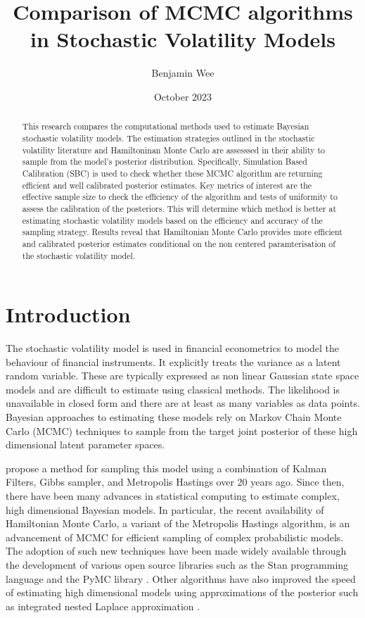 \documentclass[12pt, a4paper]{article}
\title{Comparison of MCMC algorithms in Stochastic Volatility Models}
\author{Benjamin Wee}
\date{October 2023}
\begin{document}
\maketitle 

\begin{abstract}
    This research compares the computational methods used to estimate Bayesian stochastic volatility models. The estimation strategies outlined in the stochastic volatility literature and Hamiltoninan Monte Carlo are assesssed in their ability to sample from the model's posterior distribution. Specifically, Simulation Based Calibration (SBC) is used to check whether these MCMC algorithm are returning efficient and well calibrated posterior estimates. Key metrics of interest are the effective sample size to check the efficiency of the algorithm and tests of uniformity to assess the calibration of the posteriors. This will determine which method is better at estimating stochastic volatility models based on the efficiency and accuracy of the sampling strategy. Results reveal that Hamiltonian Monte Carlo provides more efficient and calibrated posterior estimates conditional on the non centered paramterisation of the stochastic volatility model. 
\end{abstract}

\newpage

\tableofcontents{\protect\newpage}

\section{Introduction}
    The stochastic volatility model is used in financial econometrics to model the behaviour of financial instruments. It explicitly treats the variance as a latent random variable. These are typically expressed as non linear Gaussian state space models and are difficult to estimate using classical methods. The likelihood is unavailable in closed form and there are at least as many variables as data points. Bayesian approaches to estimating these models rely on  Markov Chain Monte Carlo (MCMC) techniques to sample from the target joint posterior of these high dimensional latent parameter spaces. 

    \citet{kim1998stochastic} propose a method for sampling this model using a combination of Kalman Filters, Gibbs sampler, and Metropolis Hastings over 20 years ago.  Since then, there have been many advances in statistical computing to estimate complex, high dimensional Bayesian models. In particular, the recent availability of Hamiltonian Monte Carlo, a variant of the Metropolis Hastings algorithm, is an advancement of MCMC for efficient sampling of complex probabilistic models. The adoption of such new techniques have been made widely available through the development of various open source libraries such as the Stan programming language \citep{stan} and the PyMC library \citep{pymc2023}. Other algorithms have also improved the speed of estimating high dimensional models using approximations of the posterior such as integrated nested Laplace approximation \citep{rue2009approximate}.
\end{document}
